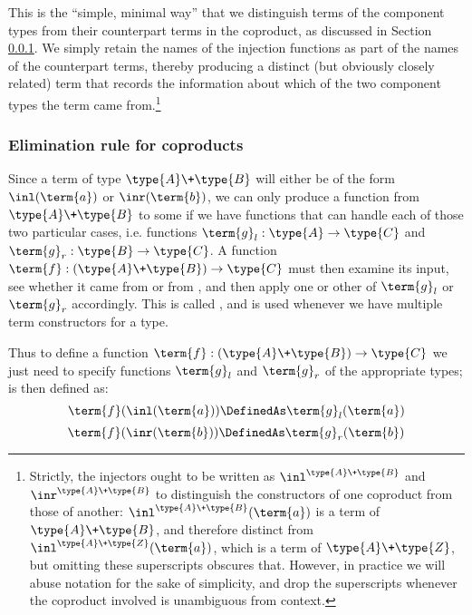 This is the ``simple, minimal way'' that we distinguish 
terms of the component types
from
their counterpart terms in the coproduct, as discussed in Section \ref{}.  We simply retain the names of the injection functions as part of the names of the counterpart terms, thereby producing a distinct (but obviously closely related) term that records the information about which of the two component types the term came from.\footnote{
Strictly, the injectors ought to be written as 
$\inl^{\type{A} \+ \type{B}}$ 
and 
$\inr^{\type{A} \+ \type{B}}$ 
to distinguish the constructors of one coproduct from those of another: 
$\inl^{\type{A} \+ \type{B}}(\term{a})$
is a term of $\type{A} \+ \type{B}$, and therefore distinct from
$\inl^{\type{A} \+ \type{Z}}(\term{a})$, which is a term of $\type{A} \+ \type{Z}$, but omitting these superscripts obscures that.  However, in practice we will abuse notation for the sake of simplicity, and drop the superscripts whenever the coproduct involved is unambiguous from context.
}





\subsubsection{Elimination rule for coproducts}

Since a term of type $\type{A} \+ \type{B}$
will either be of the form $\inl(\term{a})$ or $\inr(\term{b})$, we can only produce a function from $\type{A} \+ \type{B}$ to some  if we have functions that can handle each of those two particular cases, i.e. functions 
$\term{g}_l:\type{A} \to \type{C}$ and 
$\term{g}_r:\type{B} \to \type{C}$.  A function 
$\term{f}:(\type{A} \+ \type{B}) \to \type{C}$
 must then examine its input, see whether it came from  or from , and then apply one or other of $\term{g}_l$ or $\term{g}_r$ accordingly.  This is called , and is used whenever we have multiple term constructors for a type.  
 
Thus to define a function 
$\term{f}:(\type{A} \+ \type{B}) \to \type{C}$
we just need to specify functions $\term{g}_l$ and $\term{g}_r$ of the appropriate types;  is then defined as:
\[
\term{f}(\inl(\term{a})) \DefinedAs \term{g}_l(\term{a})
\]
\[
\term{f}(\inr(\term{b})) \DefinedAs \term{g}_r(\term{b})
\]






\newpage

